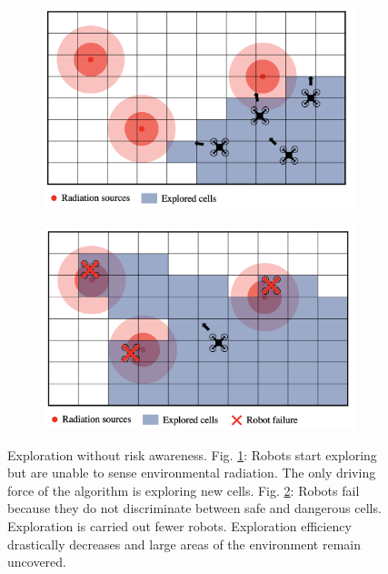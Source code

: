 \begin{figure}
     \centering
     \begin{subfigure}{0.45\textwidth}
         \centering
         \includegraphics[width=\textwidth]{figures/dora_explorer/risk_aware_b.png}
         \caption{}
         \label{risk_unaware_a}
     \end{subfigure}
     \begin{subfigure}{0.45\textwidth}
         \centering
         \includegraphics[width=\textwidth]{figures/dora_explorer/risk_unaware_a.png}
         \caption{}
         \label{risk_unaware_b}
     \end{subfigure}
        \caption[Risk-unaware exploration intuition]{Exploration without risk awareness. Fig. \ref{risk_unaware_a}: Robots start exploring but are unable to sense environmental radiation. The only driving force of the algorithm is exploring new cells. Fig. \ref{risk_unaware_b}: Robots fail because they do not discriminate between safe and dangerous cells. Exploration is carried out fewer robots. Exploration efficiency drastically decreases and large areas of the environment remain uncovered.}
        \label{risk_unaware}
\end{figure}

